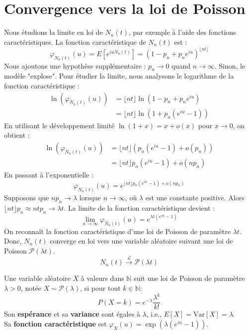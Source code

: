 \section{Convergence vers la loi de Poisson}
Nous étudions la limite en loi de $N_n(t)$, par exemple à l'aide des fonctions caractéristiques.
La fonction caractéristique de $N_n(t)$ est :
\[ \varphi_{N_n(t)}(u) = E[e^{iu N_n(t)}] = (1 - p_n + p_n e^{iu})^{\lfloor nt \rfloor} \]
Nous ajoutons une hypothèse supplémentaire : $p_n \to 0$ quand $n \to \infty$. Sinon, le modèle "explose".
Pour étudier la limite, nous analysons le logarithme de la fonction caractéristique :
\begin{align*}
\ln(\varphi_{N_n(t)}(u)) &= \lfloor nt \rfloor \ln(1 - p_n + p_n e^{iu}) \\
&= \lfloor nt \rfloor \ln(1 + p_n(e^{iu} - 1))
\end{align*}
En utilisant le développement limité $\ln(1+x) = x + o(x)$ pour $x \to 0$, on obtient :
\begin{align*}
\ln(\varphi_{N_n(t)}(u)) &= \lfloor nt \rfloor \left( p_n(e^{iu}-1) + o(p_n) \right) \\
&= \lfloor nt \rfloor p_n (e^{iu}-1) + o(n p_n)
\end{align*}
En passant à l'exponentielle :
\[ \varphi_{N_n(t)}(u) = e^{\lfloor nt \rfloor p_n (e^{iu}-1) + o(n p_n)} \]
Supposons que $np_n \to \lambda$ lorsque $n \to \infty$, où $\lambda$ est une constante positive. Alors $\lfloor nt \rfloor p_n \approx nt p_n \to \lambda t$.
La limite de la fonction caractéristique devient :
\[ \lim_{n \to \infty} \varphi_{N_n(t)}(u) = e^{\lambda t (e^{iu}-1)} \]
On reconnaît la fonction caractéristique d'une loi de Poisson de paramètre $\lambda t$.
Donc, $N_n(t)$ converge en loi vers une variable aléatoire suivant une loi de Poisson $\mathcal{P}(\lambda t)$.
\[ N_n(t) \xrightarrow{\mathcal{L}} \mathcal{P}(\lambda t) \]
\begin{remark}
Une variable aléatoire $X$ à valeurs dans $\mathbb{N}$ suit une loi de Poisson de paramètre $\lambda > 0$, notée $X \sim \mathcal{P}(\lambda)$, si pour tout $k \in \mathbb{N}$:
\[ P(X=k) = e^{-\lambda} \frac{\lambda^k}{k!} \]
Son \textbf{espérance} et sa \textbf{variance} sont égales à $\lambda$, i.e., $E[X] = \text{Var}[X] = \lambda$.\\
Sa \textbf{fonction caractéristique} est $\varphi_X(u) = \exp(\lambda(e^{iu}-1))$.
\end{remark}
